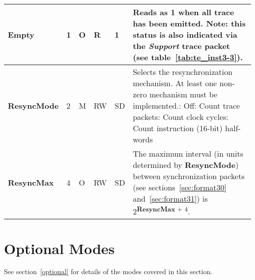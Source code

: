 \begin{table}[htp]
\begin{tabulary}{\textwidth}{|l|l|l|l|l|p{90mm}|}
    \hline
    \textbf{Empty} & 1 & O & R & 1 & Reads as 1 when all trace has been emitted.  Note: this status is also indicated via the 
      \textit{Support} trace packet (see table~\ref{tab:te_inst3-3}).\\
    \hline
    \textbf{ResyncMode} & 2 & M & RW & SD & Selects the resynchronization mechanism.  At least one non-zero mechanism must be implemented.: Off: Count trace packets: Count clock cycles: Count instruction (16-bit) half-words\\
    \hline
    \textbf{ResyncMax} & 4 & O & RW & SD & The maximum interval (in units determined by \textbf{ResyncMode}) between synchronization packets
    (see sections~\ref{sec:format30} and~\ref{sec:format31}) is 2\textsuperscript{\textbf{ResyncMax} + 4}.\\
    \hline
  \end{tabulary}
\end{table}

\FloatBarrier
\section{Optional Modes} \label{sec:ctl-modes}

See section~\ref{optional} for details of the modes covered in this section.

